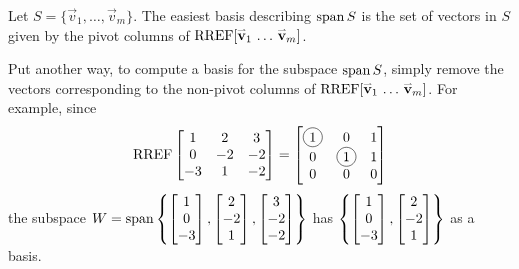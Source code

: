 \begin{fact}
  Let \(S=\{\vec v_1,\dots,\vec v_m\}\). The easiest basis describing
  \(\operatorname{span} S\) is the set of vectors in \(S\) given by the pivot columns
  of \(\operatorname{RREF}[\mathbf{\accentset{\rightharpoonup}{v}}_1\,\dots\,\mathbf{\accentset{\rightharpoonup}{v}}_m]\).

  \vspace{1em}

  Put another way, to compute a basis for the subspace \(\operatorname{span} S\),
  simply remove the vectors corresponding to the non-pivot columns of
  \(\operatorname{RREF}[\mathbf{\accentset{\rightharpoonup}{v}}_1\,\dots\,\mathbf{\accentset{\rightharpoonup}{v}}_m]\).
  For example, since
  \[
    \RREF
    \begin{bmatrix}
      1 & 2 & 3 \\
      0 & -2 & -2 \\
      -3 & 1 & -2
    \end{bmatrix}
      =
    \begin{bmatrix}
      \circledNumber{1} & 0 & 1 \\
      0 & \circledNumber{1} & 1 \\
      0 & 0 & 0
    \end{bmatrix}
  \]
  the subspace
  \(
    W=\operatorname{span}\left\{
      \begin{bmatrix}1\\0\\-3\end{bmatrix},
      \begin{bmatrix}2\\-2\\1\end{bmatrix},
      \begin{bmatrix}3\\-2\\-2\end{bmatrix}
    \right\}
  \)
  has
  \(
    \left\{
      \begin{bmatrix}1\\0\\-3\end{bmatrix},
      \begin{bmatrix}2\\-2\\1\end{bmatrix}
    \right\}
  \)
  as a basis.
\end{fact}


